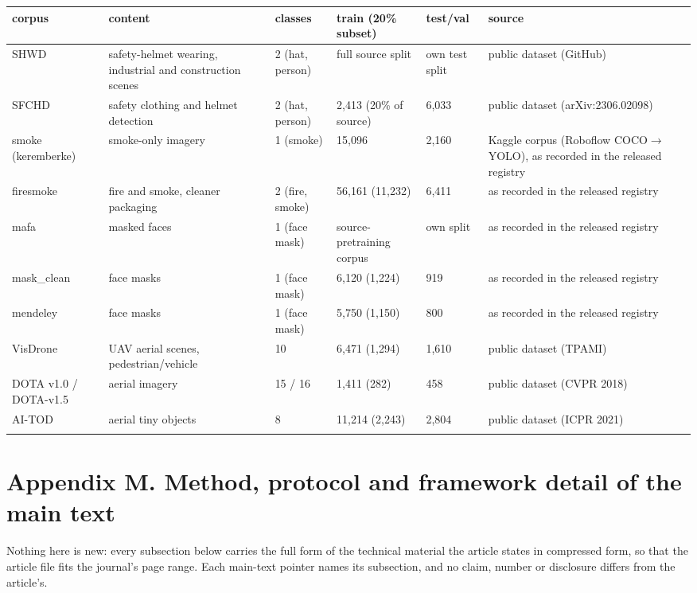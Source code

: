 \documentclass[pdflatex,sn-mathphys-ay]{sn-jnl}
\begin{document}
{\footnotesize
\setlength{\tabcolsep}{4pt}
\begin{longtable}{p{}p{}p{}p{}p{}p{}}
\toprule
corpus & content & classes & train (20\% subset) & test/val & source \\
\midrule
\endhead
SHWD \citep{jocher2026} & safety-helmet wearing, industrial and construction scenes & 2 (hat, person) & full source split & own test split & public dataset (GitHub) \\
SFCHD \citep{ning2023} & safety clothing and helmet detection & 2 (hat, person) & 2,413 (20\% of source) & 6,033 & public dataset (arXiv:2306.02098) \\
smoke (keremberke) & smoke-only imagery & 1 (smoke) & 15,096 & 2,160 & Kaggle corpus (Roboflow COCO\ensuremath{\rightarrow}YOLO), as recorded in the released registry \\
firesmoke & fire and smoke, cleaner packaging & 2 (fire, smoke) & 56,161 (11,232) & 6,411 & as recorded in the released registry \\
mafa & masked faces & 1 (face mask) & source-pretraining corpus & own split & as recorded in the released registry \\
mask\_clean & face masks & 1 (face mask) & 6,120 (1,224) & 919 & as recorded in the released registry \\
mendeley & face masks & 1 (face mask) & 5,750 (1,150) & 800 & as recorded in the released registry \\
VisDrone \citep{andriushchenko2023} & UAV aerial scenes, pedestrian/vehicle & 10 & 6,471 (1,294) & 1,610 & public dataset (TPAMI) \\
DOTA v1.0 \citep{dziugaite2020} / DOTA-v1.5 & aerial imagery & 15 / 16 & 1,411 (282) & 458 & public dataset (CVPR 2018) \\
AI-TOD \citep{dinh2017} & aerial tiny objects & 8 & 11,214 (2,243) & 2,804 & public dataset (ICPR 2021) \\
\botrule
\end{longtable}}

\section*{Appendix M. Method, protocol and framework detail of the main text}

Nothing here is new: every subsection below carries the full form of the technical material the article states in compressed form, so that the article file fits the journal's page range. Each main-text pointer names its subsection, and no claim, number or disclosure differs from the article's.
\end{document}
